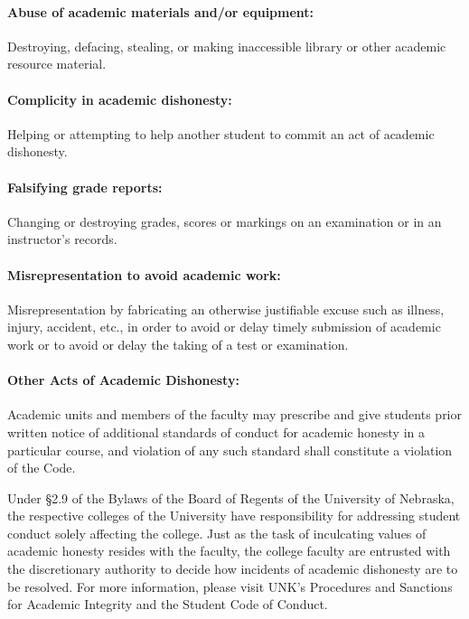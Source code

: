 \documentclass[12pt,fullpage]{article}
\newcounter{ex}\setcounter{ex}{0}
\begin{document}
\paragraph{Abuse of academic materials and/or equipment:} Destroying, defacing, stealing, or making inaccessible library
or other academic resource material.

\paragraph{Complicity in academic dishonesty:} Helping or attempting to help another student to commit an act of
academic dishonesty.

\paragraph{Falsifying grade reports:} Changing or destroying grades, scores or markings on an examination or in an
instructor's records.

\paragraph{Misrepresentation to avoid academic work:} Misrepresentation by fabricating an otherwise justifiable excuse
such as illness, injury, accident, etc., in order to avoid or delay timely submission of academic work or to
avoid or delay the taking of a test or examination.

\paragraph{Other Acts of Academic Dishonesty:} Academic units and members of the faculty may prescribe and give
students prior written notice of additional standards of conduct for academic honesty in a particular course,
and violation of any such standard shall constitute a violation of the Code.

Under \S 2.9 of the Bylaws of the Board of Regents of the University of Nebraska, the respective colleges
of the University have responsibility for addressing student conduct solely affecting the college. Just as the
task of inculcating values of academic honesty resides with the faculty, the college faculty are entrusted with
the discretionary authority to decide how incidents of academic dishonesty are to be resolved. For more
information, please visit UNK's Procedures and Sanctions for Academic Integrity and the Student Code of
Conduct.












\newpage
\end{document}
